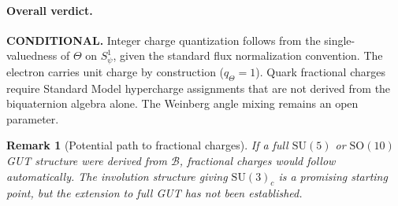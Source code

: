\documentclass[11pt,a4paper]{article}
\newtheorem{remark}[proposition]{Remark}
\begin{document}
\paragraph{Overall verdict.}
\textbf{CONDITIONAL.}
Integer charge quantization follows from the single-valuedness of $\Theta$ on
$S^1_\psi$, given the standard flux normalization convention.  The electron
carries unit charge by construction ($q_\Theta=1$).  Quark fractional charges
require Standard Model hypercharge assignments that are not derived from the
biquaternion algebra alone.  The Weinberg angle mixing remains an open parameter.

\begin{remark}[Potential path to fractional charges]
If a full $\mathrm{SU}(5)$ or $\mathrm{SO}(10)$ GUT structure were derived
from $\mathcal{B}$, fractional charges would follow automatically.  The
involution structure giving $\mathrm{SU}(3)_c$ is a promising starting point,
but the extension to full GUT has not been established.
\end{remark}
\end{document}
